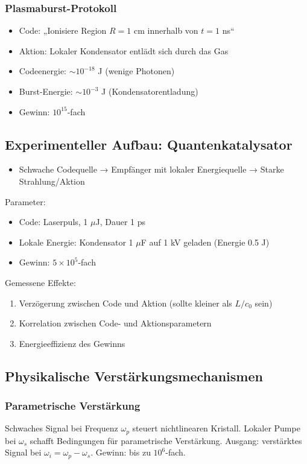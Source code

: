 \documentclass[11pt,a4paper]{article}
\begin{document}
	\subsubsection{Plasmaburst-Protokoll}
	\begin{itemize}
		\item Code: „Ionisiere Region $R=1$ cm innerhalb von $t=1$ ns“
		\item Aktion: Lokaler Kondensator entlädt sich durch das Gas
		\item Codeenergie: $\sim 10^{-18}$ J (wenige Photonen)
		\item Burst-Energie: $\sim 10^{-3}$ J (Kondensatorentladung)
		\item Gewinn: $10^{15}$-fach
	\end{itemize}
	
	\subsection{Experimenteller Aufbau: Quantenkatalysator}
	
	\begin{itemize}
		\item Schwache Codequelle → Empfänger mit lokaler Energiequelle → Starke Strahlung/Aktion
	\end{itemize}
	
	Parameter:
	\begin{itemize}
		\item Code: Laserpuls, 1 $\mu$J, Dauer 1 ps
		\item Lokale Energie: Kondensator 1 $\mu$F auf 1 kV geladen (Energie 0.5 J)
		\item Gewinn: $5 \times 10^5$-fach
	\end{itemize}
	
	Gemessene Effekte:
	\begin{enumerate}
		\item Verzögerung zwischen Code und Aktion (sollte kleiner als $L/c_0$ sein)
		\item Korrelation zwischen Code- und Aktionsparametern
		\item Energieeffizienz des Gewinns
	\end{enumerate}
	
	\subsection{Physikalische Verstärkungsmechanismen}
	
	\subsubsection{Parametrische Verstärkung}
	Schwaches Signal bei Frequenz $\omega_p$ steuert nichtlinearen Kristall. Lokaler Pumpe bei $\omega_s$ schafft Bedingungen für parametrische Verstärkung. Ausgang: verstärktes Signal bei $\omega_i = \omega_p - \omega_s$. Gewinn: bis zu $10^6$-fach.
	
\end{document}
